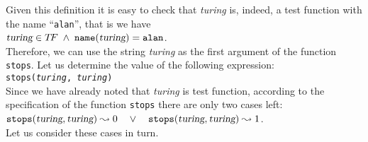 Given this definition it is easy to check that \textsl{turing} is, indeed, a test function with the name
``\texttt{alan}'', that is we have 
\\[0.3cm]
\hspace*{1.3cm} 
$\textsl{turing} \in T\!F \;\wedge\; \mathtt{name}(\textsl{turing}) = \mathtt{alan}$. 
\\[0.2cm]
Therefore, we can use the string \textsl{turing} as the first argument of the function
\texttt{stops}.  Let us determine the value of the following expression:
\\[0.2cm]
\hspace*{1.3cm} 
\texttt{stops(\textsl{turing}, \textsl{turing})} 
\\[0.2cm]
Since we have already noted that \textsl{turing} is test function, according to the specification of
the function \texttt{stops} there are only two cases left:
\\[0.2cm]
\hspace*{1.3cm} 
$\mathtt{stops}(\textsl{turing}, \textsl{turing}) \leadsto 0 \quad \vee\quad
 \mathtt{stops}(\textsl{turing}, \textsl{turing}) \leadsto 1$. 
\\[0.2cm]
Let us consider these cases in turn.
